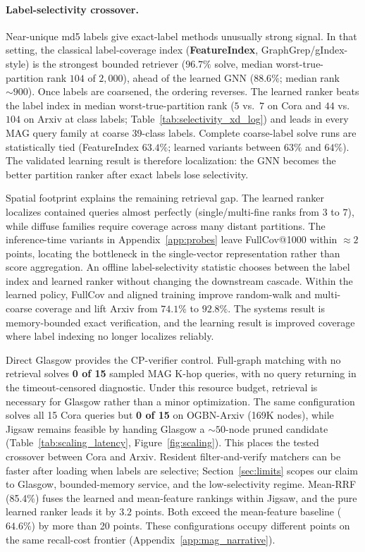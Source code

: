 \documentclass{article}
\begin{document}
\paragraph{Label-selectivity crossover.} Near-unique md5 labels give exact-label methods unusually strong signal. In that setting, the classical label-coverage index (\textbf{FeatureIndex}, GraphGrep/gIndex-style) is the strongest bounded retriever ($96.7\%$ solve, median worst-true-partition rank $104$ of $2{,}000$), ahead of the learned GNN ($88.6\%$; median rank ${\sim}900$). Once labels are coarsened, the ordering reverses. The learned ranker beats the label index in median worst-true-partition rank ($5$ vs.\ $7$ on Cora and $44$ vs.\ $104$ on Arxiv at class labels; Table~\ref{tab:selectivity_xd_log}) and leads in every MAG query family at coarse 39-class labels. Complete coarse-label solve runs are statistically tied (FeatureIndex $63.4\%$; learned variants between $63\%$ and $64\%$). The validated learning result is therefore localization: the GNN becomes the better partition ranker after exact labels lose selectivity.

Spatial footprint explains the remaining retrieval gap. The learned ranker localizes contained queries almost perfectly (single/multi-fine ranks from $3$ to $7$), while diffuse families require coverage across many distant partitions. The inference-time variants in Appendix~\ref{app:probes} leave FullCov@1000 within ${\approx}2$ points, locating the bottleneck in the single-vector representation rather than score aggregation. An offline label-selectivity statistic chooses between the label index and learned ranker without changing the downstream cascade. Within the learned policy, FullCov and aligned training improve random-walk and multi-coarse coverage and lift Arxiv from $74.1\%$ to $92.8\%$. The systems result is memory-bounded exact verification, and the learning result is improved coverage where label indexing no longer localizes reliably.

Direct Glasgow provides the CP-verifier control. Full-graph matching with no retrieval solves \textbf{0 of 15} sampled MAG K-hop queries, with no query returning in the timeout-censored diagnostic. Under this resource budget, retrieval is necessary for Glasgow rather than a minor optimization. The same configuration solves all 15 Cora queries but \textbf{0 of 15} on OGBN-Arxiv (169K nodes), while Jigsaw remains feasible by handing Glasgow a $\sim\!50$-node pruned candidate (Table~\ref{tab:scaling_latency}, Figure~\ref{fig:scaling}). This places the tested crossover between Cora and Arxiv. Resident filter-and-verify matchers can be faster after loading when labels are selective; Section~\ref{sec:limits} scopes our claim to Glasgow, bounded-memory service, and the low-selectivity regime. Mean-RRF (85.4\%) fuses the learned and mean-feature rankings within Jigsaw, and the pure learned ranker leads it by $3.2$ points. Both exceed the mean-feature baseline ($64.6\%$) by more than 20 points. These configurations occupy different points on the same recall-cost frontier (Appendix~\ref{app:mag_narrative}).
\end{document}
